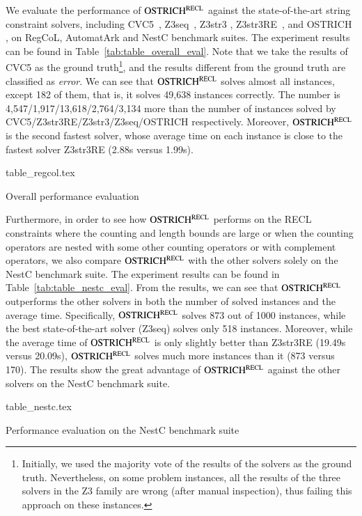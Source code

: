 We evaluate the performance of $\rm OSTRICH^{RECL}$ against the state-of-the-art string constraint solvers, including CVC5~\cite{cvc5}, Z3seq~\cite{z3seq}, Z3str3 \cite{Z3-str3}, Z3str3RE~\cite{BD+23}, and OSTRICH \cite{CHL+19}, on RegCoL, AutomatArk and NestC benchmark suites. 
The experiment results can be found in Table~\ref{tab:table_overall_eval}. Note that we take the results of CVC5 as the ground truth\footnote{Initially,  we used the majority vote of the results of the solvers as the ground truth. Nevertheless, on some problem instances, all the results of the three solvers in the Z3 family are wrong (after manual inspection), thus failing this approach on these instances.}, and the results different from the ground truth are classified as \emph{error}. We can see that $\rm OSTRICH^{RECL}$ solves almost all instances, except 182 of them, that is, it solves 49,638 instances correctly. The number is 4,547/1,917/13,618/2,764/3,134 more than the number of instances solved by CVC5/Z3str3RE/Z3str3/Z3seq/OSTRICH respectively.
%
Moreover, $\rm OSTRICH^{RECL}$ is the second fastest solver, whose average time on each instance is close to the fastest solver Z3str3RE (2.88s versus 1.99s). 

\begin{table}[htbp]
  \centering\vskip 0pt
    {table_regcol.tex}
    \caption{Overall performance evaluation}
  \label{tab:table_overall_eval}
\end{table}

Furthermore, in order to see how $\rm OSTRICH^{RECL}$ performs on the RECL constraints where the counting and length bounds are large or when the counting operators are nested with some other counting operators or with complement operators, we also compare $\rm OSTRICH^{RECL}$ with the other solvers solely on the NestC benchmark suite. The experiment results can be found in Table~\ref{tab:table_nestc_eval}. From the results, we can see that $\rm OSTRICH^{RECL}$ outperforms the other solvers in both the number of solved instances and the average time. Specifically, $\rm OSTRICH^{RECL}$ solves 873 out of 1000 instances, while the best state-of-the-art solver (Z3seq) solves only 518 instances. Moreover, while the average time of $\rm OSTRICH^{RECL}$ is only slightly better than Z3str3RE (19.49s versus 20.09s), $\rm OSTRICH^{RECL}$ solves much more instances than it (873 versus 170). The results show the great advantage of $\rm OSTRICH^{RECL}$ against the other solvers on the NestC benchmark suite. 

\begin{table}[htbp]
  \centering\vskip 0pt
    {table_nestc.tex}
    \caption{Performance evaluation on the NestC benchmark suite}
  \label{tab:table_nestc_eval}
\end{table}


